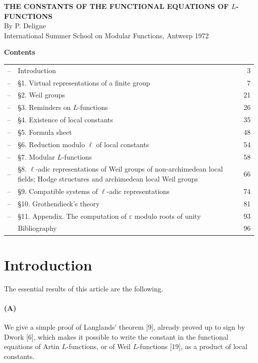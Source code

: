 \documentclass[10pt]{article}
\begin{document}
\begin{center}
{\Large\bfseries THE CONSTANTS OF THE FUNCTIONAL EQUATIONS OF \(L\)-FUNCTIONS}\\[2em]
{\large By P. Deligne}\\[6em]
International Summer School on Modular Functions, Antwerp 1972
\end{center}

\newpage

\begin{center}
\bfseries Contents
\end{center}

\begin{tabularx}{\textwidth}{@{}p{}Xr@{}}
--& Introduction & 3\\
--& \S1. Virtual representations of a finite group & 7\\
--& \S2. Weil groups & 21\\
--& \S3. Reminders on \(L\)-functions & 26\\
--& \S4. Existence of local constants & 35\\
--& \S5. Formula sheet & 48\\
--& \S6. Reduction modulo \(\ell\) of local constants & 54\\
--& \S7. Modular \(L\)-functions & 58\\
--& \S8. \(\ell\)-adic representations of Weil groups of non-archimedean local fields; Hodge structures and archimedean local Weil groups & 66\\
--& \S9. Compatible systems of \(\ell\)-adic representations & 74\\
--& \S10. Grothendieck's theory & 81\\
--& \S11. Appendix. The computation of \(\varepsilon\) modulo roots of unity & 93\\
& Bibliography & 96
\end{tabularx}

\newpage

\section*{Introduction}

The essential results of this article are the following.

\paragraph{(A)} We give a simple proof of Langlands' theorem [9], already proved up to sign by Dwork [6], which makes it possible to write the constant in the functional equations of Artin \(L\)-functions, or of Weil \(L\)-functions [19], as a product of local constants.
\end{document}
